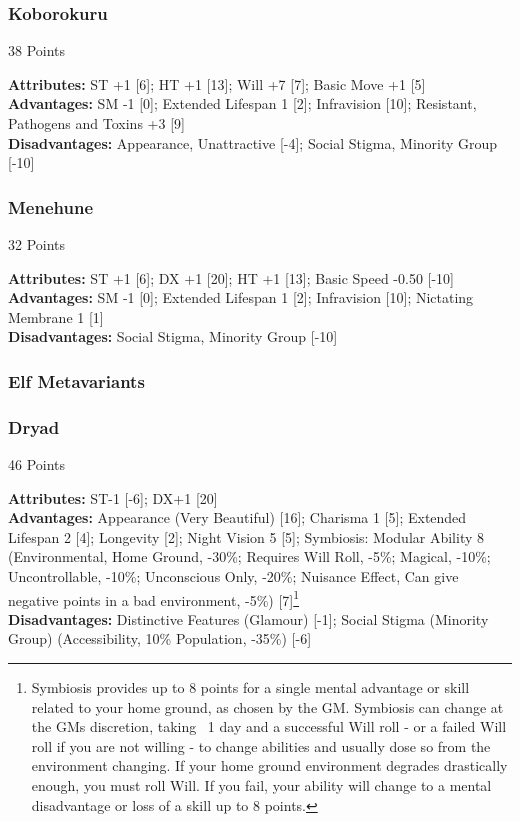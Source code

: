 \begin{multicols*}{3}
	\subsubsection*{Koborokuru}
	\begin{flushright}
		38 Points
	\end{flushright}
	\textbf{Attributes:}
	ST +1 [6]; HT +1 [13]; Will +7 [7]; Basic Move +1 [5]
	\textbf{Advantages:}
	SM -1 [0]; Extended Lifespan 1 [2]; Infravision [10]; Resistant, Pathogens and Toxins +3 [9]
	\\\textbf{Disadvantages:} 
	Appearance, Unattractive [-4]; Social Stigma, Minority Group [-10]
	
	\subsubsection*{Menehune}
	\begin{flushright}
		32 Points
	\end{flushright}
	\textbf{Attributes:}
	ST +1 [6]; DX +1 [20]; HT +1 [13]; Basic Speed -0.50 [-10]
	\textbf{Advantages:}
	SM -1 [0]; Extended Lifespan 1 [2]; Infravision [10]; Nictating Membrane 1 [1]
	\\\textbf{Disadvantages:} 
	Social Stigma, Minority Group [-10]
	
	\subsubsection{Elf Metavariants}
	
	\subsubsection*{Dryad}
	\begin{flushright}
		46 Points
	\end{flushright}
	\textbf{Attributes:} 
	ST-1 [-6]; DX+1 [20]
	\\\textbf{Advantages:} 
	Appearance (Very Beautiful) [16]; Charisma 1 [5]; Extended Lifespan 2 [4]; Longevity [2]; Night Vision 5 [5]; Symbiosis: Modular Ability 8 (Environmental, Home Ground, -30\%; Requires Will Roll, -5\%; Magical, -10\%; Uncontrollable, -10\%; Unconscious Only, -20\%; Nuisance Effect, Can give negative points in a bad environment, -5\%) [7]\footnote{Symbiosis provides up to 8 points for a single mental advantage or skill related to your home ground, as chosen by the GM. Symbiosis can change at the GMs discretion, taking ~1 day and a successful Will roll - or a failed Will roll if you are not willing - to change abilities and usually dose so from the environment changing. If your home ground environment degrades drastically enough, you must roll Will. If you fail, your ability will change to a mental disadvantage or loss of a skill up to 8 points.}
	\\\textbf{Disadvantages:} 
	Distinctive Features (Glamour) [-1]; Social Stigma (Minority Group) (Accessibility, 10\% Population, -35\%) [-6]
	

\end{multicols*}
